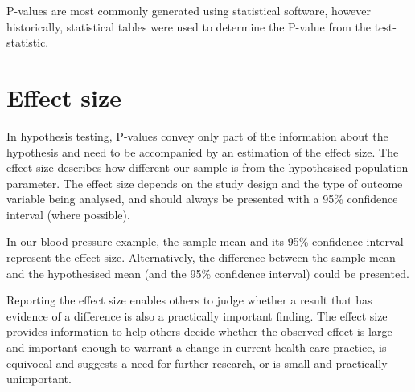 \documentclass[
  a4paper,
]{memoir}
\begin{document}
\begin{table}

\caption{\label{tbl-4-1}Interpretation of P-values}


\end{table}%

P-values are most commonly generated using statistical software, however
historically, statistical tables were used to determine the P-value from
the test-statistic.

\section{Effect size}\label{effect-size}

In hypothesis testing, P-values convey only part of the information
about the hypothesis and need to be accompanied by an estimation of the
effect size. The effect size describes how different our sample is from
the hypothesised population parameter. The effect size depends on the
study design and the type of outcome variable being analysed, and should
always be presented with a 95\% confidence interval (where possible).

In our blood pressure example, the sample mean and its 95\% confidence
interval represent the effect size. Alternatively, the difference
between the sample mean and the hypothesised mean (and the 95\%
confidence interval) could be presented.

Reporting the effect size enables others to judge whether a result that
has evidence of a difference is also a practically important finding.
The effect size provides information to help others decide whether the
observed effect is large and important enough to warrant a change in
current health care practice, is equivocal and suggests a need for
further research, or is small and practically unimportant.
\end{document}
